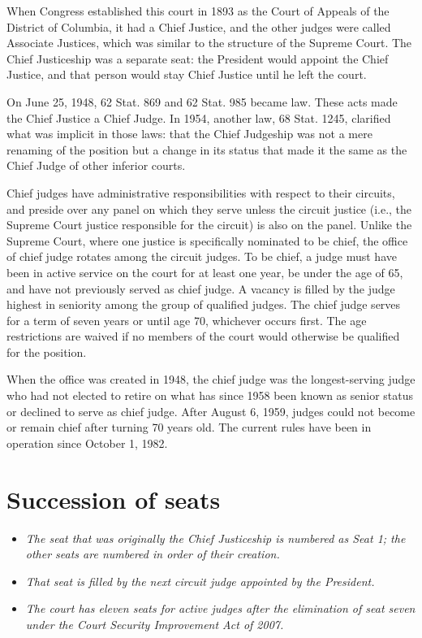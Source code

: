 When Congress established this court in 1893 as the Court of Appeals of
the District of Columbia, it had a Chief Justice, and the other judges
were called Associate Justices, which was similar to the structure of
the Supreme Court. The Chief Justiceship was a separate seat: the
President would appoint the Chief Justice, and that person would stay
Chief Justice until he left the court.

On June 25, 1948, 62 Stat. 869 and 62 Stat. 985 became law. These acts
made the Chief Justice a Chief Judge. In 1954, another law, 68 Stat.
1245, clarified what was implicit in those laws: that the Chief
Judgeship was not a mere renaming of the position but a change in its
status that made it the same as the Chief Judge of other inferior
courts.

Chief judges have administrative responsibilities with respect to their
circuits, and preside over any panel on which they serve unless the
circuit justice (i.e., the Supreme Court justice responsible for the
circuit) is also on the panel. Unlike the Supreme Court, where one
justice is specifically nominated to be chief, the office of chief judge
rotates among the circuit judges. To be chief, a judge must have been in
active service on the court for at least one year, be under the age of
65, and have not previously served as chief judge. A vacancy is filled
by the judge highest in seniority among the group of qualified judges.
The chief judge serves for a term of seven years or until age 70,
whichever occurs first. The age restrictions are waived if no members of
the court would otherwise be qualified for the position.

When the office was created in 1948, the chief judge was the
longest-serving judge who had not elected to retire on what has since
1958 been known as senior status or declined to serve as chief judge.
After August 6, 1959, judges could not become or remain chief after
turning 70 years old. The current rules have been in operation since
October 1, 1982.

\section{Succession of seats}\label{succession-of-seats}

\begin{itemize}
\item
  \emph{The seat that was originally the Chief Justiceship is numbered
  as Seat 1; the other seats are numbered in order of their creation.}
\item
  \emph{That seat is filled by the next circuit judge appointed by the
  President.}
\item
  \emph{The court has eleven seats for active judges after the
  elimination of seat seven under the Court Security Improvement Act of
  2007.}
\end{itemize}

